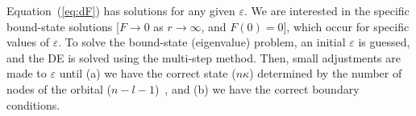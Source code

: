 \documentclass[10pt,twocolumn,a4paper]{article}%
\newcommand{\matr}[4]{\ensuremath{\begin{pmatrix}#1&#2\\#3&#4\end{pmatrix}}}	%
\newcommand{\be}{\begin{equation}}
\newcommand{\ee}{\end{equation}}
\def\en{\ensuremath{\varepsilon}}
\def\p{\ensuremath{\partial}}
\renewcommand{\k}{\ensuremath{\kappa}}
\begin{document}
%
%
%

Equation~(\ref{eq:dF}) has solutions for any given $\en$. 
We are interested in the specific bound-state solutions [$F\to0$ as $r\to\infty$, and $F(0)=0$], which occur for specific values of $\en$.
To solve the bound-state (eigenvalue) problem, an initial $\en$ is guessed, and the DE is solved using the multi-step method.
Then, small adjustments are made to $\en$ until (a) we have the correct state ($n\k$) determined by the number of nodes of the orbital ($n-l-1$)~\cite{BetheBook}, and (b) we have the correct boundary conditions.
\end{document}
